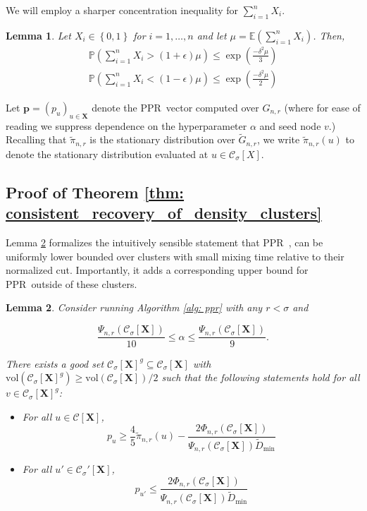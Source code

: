 \documentclass{article}
\newcommand{\set}[1]{\left\{#1\right\}}
\newcommand{\vol}{\mathrm{vol}}
\newcommand{\1}{\mathbf{1}}
\newcommand{\pbf}{\mathbf{p}}
\newcommand{\Xbf}{\mathbf{X}}
\newcommand{\Pbb}{\mathbb{P}}
\newcommand{\Ebb}{\mathbb{E}}
\newcommand{\Cset}{\mathcal{C}}
\newcommand{\Csig}{\Cset_{\sigma}}
\newcommand{\pprspace}{{\sc PPR~}}
\theoremstyle{aldenthm}
\newtheorem{lemma}{Lemma}
\begin{document}
We will employ a sharper concentration inequality for $\sum_{i = 1}^{n} X_i$.
\begin{lemma}
	\label{lem: multiplicative_Hoeffding}
	Let $X_i \in \set{0,1}$ for $i = 1, \ldots, n$ and let $\mu = \Ebb(\sum_{i = 1}^n X_i)$. Then,
	\begin{align*}
	\Pbb\left(\sum_{i=1}^{n}X_i > (1 + \epsilon) \mu \right) \leq \exp \left(\frac{-\delta^2 \mu}{3}\right) \\
	\Pbb\left(\sum_{i=1}^{n}X_i < (1 - \epsilon) \mu \right) \leq \exp \left(\frac{-\delta^2 \mu}{2}\right)
	\end{align*}
\end{lemma}

Let $\pbf = (p_u)_{u \in \Xbf}$ denote the \pprspace vector computed over $G_{n,r}$ (where for ease of reading we suppress dependence on the hyperparameter $\alpha$ and seed node $v$.) 
Recalling that $\widetilde{\pi}_{n,r}$ is the stationary distribution over $\widetilde{G}_{n,r}$, we write $\widetilde{\pi}_{n,r}(u)$ to denote the stationary distribution evaluated at $u \in \Csig[X]$. 

\subsection{Proof of Theorem \ref{thm: consistent_recovery_of_density_clusters}}
\label{sec: proof_of_consistent_cluster_recovery}

Lemma \ref{lem: setup} formalizes the intuitively sensible statement that \pprspace, can be uniformly lower bounded over clusters with small mixing time relative to their normalized cut. Importantly, it adds a corresponding upper bound for \pprspace outside of these clusters.
\begin{lemma} 
	\label{lem: setup}
	Consider running Algorithm \ref{alg: ppr} with any $r < \sigma$ and
	
	\begin{equation} 
	\label{eqn: upper_bound_alpha}
	\frac{\Psi_{n,r}(\Csig[\Xbf])}{10} \leq \alpha \leq \frac{\Psi_{n,r}(\Csig[\Xbf])}{9}.
	\end{equation}
	
	There exists a good set $\Csig[\Xbf]^g \subseteq \Csig[\Xbf]$ with $\vol(\Csig[\Xbf]^g) \geq \vol(\Csig[\Xbf])/2$ such that the following statements hold for all $v \in \Csig[\Xbf]^g$:
	\begin{itemize}
		\item For all $u \in \Cset[\Xbf]$,
		\begin{equation}
		\label{eqn: lower_bound_PPR_in_cluster}
		p_u \geq \frac{4}{5} \widetilde{\pi}_{n,r}(u) - \frac{2 \Phi_{n,r}(\Csig[\Xbf])}{\Psi_{n,r}(\Csig[\Xbf]) \widetilde{D}_{\min}}
		\end{equation}
		\item For all $u' \in \Csig'[\Xbf]$,
		\begin{equation}
		\label{eqn: upper_bound_PPR_in_other_cluster}
		p_{u'} \leq \frac{2 \Phi_{n,r}(\Csig[\Xbf])}{\Psi_{n,r}(\Csig[\Xbf]) \widetilde{D}_{\min}}
		\end{equation}
	\end{itemize}
\end{lemma}
\end{document}
